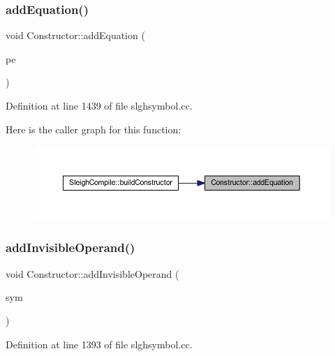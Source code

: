 \subsubsection{\texorpdfstring{addEquation()}{addEquation()}}
{\footnotesize\ttfamily void Constructor\+::add\+Equation (\begin{DoxyParamCaption}\item[{\mbox{\hyperlink{class_pattern_equation}{Pattern\+Equation}} $\ast$}]{pe }\end{DoxyParamCaption})}



Definition at line 1439 of file slghsymbol.\+cc.

Here is the caller graph for this function\+:
\nopagebreak
\begin{figure}[H]
\begin{center}
\leavevmode
\includegraphics[width=350pt]{class_constructor_a28952428d219c38b0dc2a8c800c2c96e_icgraph}
\end{center}
\end{figure}
\mbox{\label{class_constructor_ad99b2273a274feb05ff73a2e71ed72c0}} 
\subsubsection{\texorpdfstring{addInvisibleOperand()}{addInvisibleOperand()}}
{\footnotesize\ttfamily void Constructor\+::add\+Invisible\+Operand (\begin{DoxyParamCaption}\item[{\mbox{\hyperlink{class_operand_symbol}{Operand\+Symbol}} $\ast$}]{sym }\end{DoxyParamCaption})}



Definition at line 1393 of file slghsymbol.\+cc.

